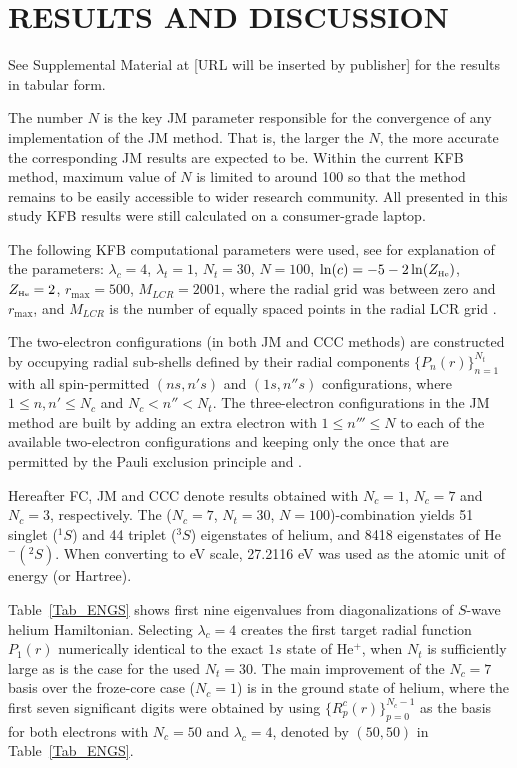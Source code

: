 \documentclass[aip
, pra
, showpacs
, aps
, twocolumn
, groupedaddress
, floatfix
]{revtex4}
\begin{document}
\section{RESULTS AND DISCUSSION}

See Supplemental Material at [URL will be inserted by publisher] for the results in tabular form.

The number $N$ is the key JM parameter responsible for the convergence of any implementation of the JM method.
That is, the larger the $N$, the more accurate the corresponding JM results are expected to be.
Within the current KFB method, maximum value of $N$ is limited to around 100 so that the method remains to be easily accessible
to wider research community. All presented in this study KFB results were still calculated on a consumer-grade laptop.


The following KFB computational parameters were used, see \cite{KB10p022708} for explanation of the parameters:
$\lambda_c=4$, $\lambda_t=1$, $N_t=30$, $N=100$, $\ln(c)=-5 - 2\ln(Z_{\mbox{\tiny{He}}} )$, $Z_{\mbox{\tiny{He}}}=2$, $r_{\max}=500$,
$M_{LCR}=2001$, where the radial grid was between zero and $r_{\max}$, and
$M_{LCR}$ is the number of equally spaced points in the radial LCR grid \cite{KB10p022708}.

The two-electron configurations (in both JM and CCC methods) are constructed by occupying radial sub-shells defined by their radial components $\{P_n(r)\}_{n=1}^{N_t}$  with all spin-permitted $(ns,n's)$ and $(1s,n''s)$ configurations,
where $1 \leq n,n'\leq N_c$ and $N_c<n''<N_t$.
The three-electron configurations in the JM method are built by adding an extra electron with $1 \leq n''' \leq N$ to each of the available two-electron configurations and keeping only the once that are permitted by the Pauli exclusion principle and .


Hereafter FC, JM and CCC denote results obtained with $N_c=1$, $N_c=7$ and $N_c=3$, respectively.
The ($N_c=7$, $N_t=30$, $N=100$)-combination yields 51 singlet ($^1S$) and 44 triplet ($^3S$) eigenstates of helium, and 8418 eigenstates of He$^-(^2S)$.
When converting to eV scale, 27.2116 eV was used as the atomic unit of energy (or Hartree).

Table~\ref{Tab_ENGS} shows first nine eigenvalues from diagonalizations of $S$-wave helium Hamiltonian.
Selecting $\lambda_c=4$ creates the first target radial function $P_1(r)$ numerically identical to the exact $1s$ state of He$^+$,
when $N_t$ is sufficiently large as is the case for the used $N_t=30$.
The main improvement of the $N_c=7$ basis over the froze-core case ($N_c=1$) is in the ground state of helium, where
the first seven significant digits \cite{G94} were obtained by using  $\{R^{c}_p(r)\}_{p=0}^{N_c-1}$ as the basis for both electrons with $N_c=50$ and $\lambda_c=4$, denoted by $(50,50)$ in Table~\ref{Tab_ENGS}.
\end{document}

